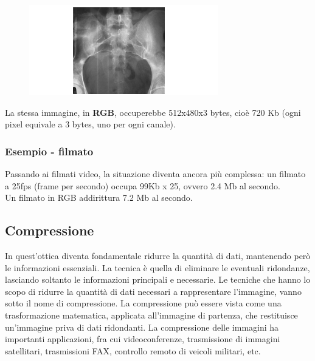\begin{figure}[H]
    \centering
    \includegraphics[width=\linewidth, keepaspectratio]{capitoli/immagini/imgs/esempio-compressione-immagini.png}
\end{figure}

La stessa immagine, in \textbf{RGB}, occuperebbe 512x480x3 bytes, cioè 720 Kb (ogni pixel equivale a 3 bytes, uno per ogni canale).

\subsubsection*{Esempio - filmato}
Passando ai filmati video, la situazione diventa ancora più complessa: un filmato a 25fps (frame per secondo) occupa 99Kb x 25, ovvero 2.4 Mb al secondo.
\\Un filmato in RGB addirittura 7.2 Mb al secondo.

\subsection{Compressione}
In quest'ottica diventa fondamentale ridurre la quantità di dati, mantenendo però le informazioni essenziali. La tecnica è quella di
eliminare le eventuali ridondanze, lasciando soltanto le informazioni principali e necessarie.
Le tecniche che hanno lo scopo di ridurre la quantità di dati necessari a rappresentare l'immagine, vanno sotto il nome di compressione. La compressione può essere vista come una trasformazione matematica, applicata all'immagine di partenza,
che restituisce un'immagine priva di dati ridondanti. La compressione delle immagini ha importanti applicazioni, fra cui videoconferenze, trasmissione di immagini satellitari, trasmissioni FAX, controllo remoto di veicoli militari, etc.


